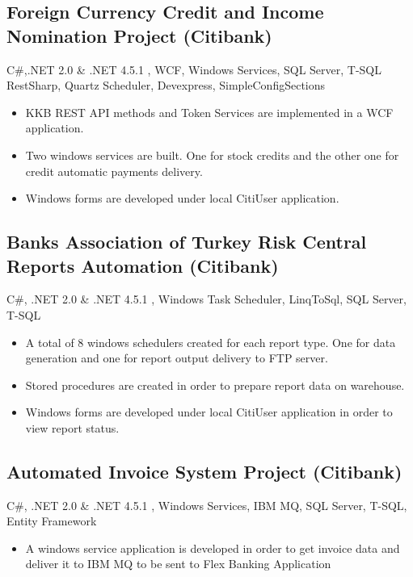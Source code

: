 \documentclass[1pt,a4paper,verdana]{moderncv} %
\begin{document}
\subsection{Foreign Currency Credit and Income Nomination Project (Citibank)}
 {C\#,.NET 2.0 \& .NET 4.5.1 , WCF, Windows Services, SQL Server, T-SQL }
 {RestSharp, Quartz Scheduler, Devexpress, SimpleConfigSections}
 {\begin{itemize}
		\item KKB REST API methods and Token Services are implemented in a WCF application.
		\item Two windows services are built. One for stock credits and the other one for credit automatic payments delivery.
		\item Windows forms are developed under local CitiUser application.
\end{itemize}}

\subsection{Banks Association of Turkey Risk Central Reports Automation (Citibank)}
 {C\#, .NET 2.0 \& .NET 4.5.1 , Windows Task Scheduler, LinqToSql, SQL Server, T-SQL}
 {\begin{itemize}
		\item A total of 8 windows schedulers created for each report type. One for data generation and one for report output delivery to FTP server.
		\item Stored procedures are created in order to prepare report data on warehouse.
		\item Windows forms are developed under local CitiUser application in order to view report status.
\end{itemize}}

\subsection{Automated Invoice System Project (Citibank)}
 {C\#, .NET 2.0 \& .NET 4.5.1 , Windows Services, IBM MQ, SQL Server, T-SQL, Entity Framework}
 {\begin{itemize}
		\item A windows service application is developed in order to get invoice data and deliver it to IBM MQ to be sent to Flex Banking Application		
\end{itemize}}
\end{document}
